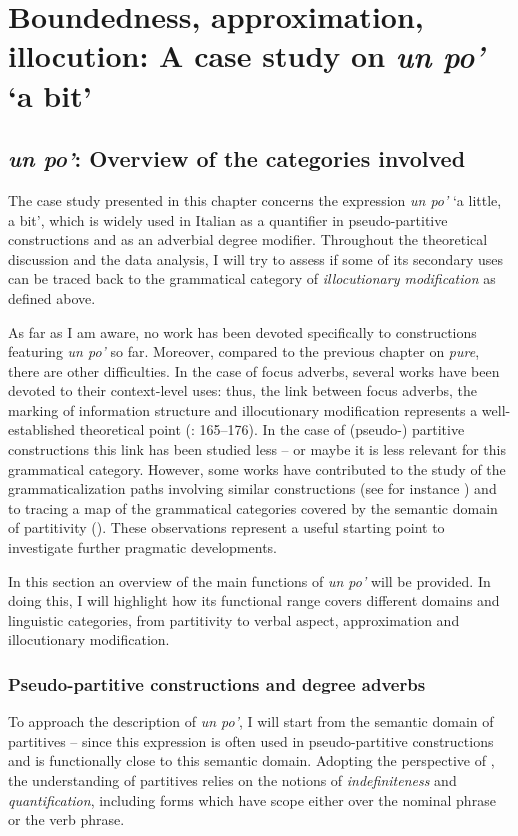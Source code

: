 \chapter{Boundedness, approximation, illocution: A case study on \textit{un po’} ‘a bit’}\label{sec:7}
\hypertarget{Toc124860657}{}\section{\textit{un po’}: Overview of the categories involved}
\hypertarget{Toc124860658}{}
The case study presented in this chapter concerns the expression \textit{un po’} ‘a little, a bit’, which is widely used in Italian as a quantifier in pseudo-partitive constructions and as an adverbial degree modifier. Throughout the theoretical discussion and the data analysis, I will try to assess if some of its secondary uses can be traced back to the grammatical category of \textit{illocutionary modification} as defined above.

As far as I am aware, no work has been devoted specifically to constructions featuring \textit{un po’} so far. Moreover, compared to the previous chapter on \textit{pure}, there are other difficulties. In the case of focus adverbs, several works have been devoted to their context-level uses: thus, the link between focus adverbs, the marking of information structure and illocutionary modification represents a well-established theoretical point (\citealt{König1991}: 165–176). In the case of (pseudo-) partitive constructions this link has been studied less – or maybe it is less relevant for this grammatical category. However, some works have contributed to the study of the grammaticalization paths involving similar constructions (see for instance \citealt{Traugott2008}) and to tracing a map of the grammatical categories covered by the semantic domain of partitivity (\citealt{LuraghiHuumo2014}). These observations represent a useful starting point to investigate further pragmatic developments.

In this section an overview of the main functions of \textit{un po’} will be provided. In doing this, I will highlight how its functional range covers different domains and linguistic categories, from partitivity to verbal aspect, approximation and illocutionary modification.

\subsection{Pseudo-partitive constructions and degree adverbs}
\hypertarget{Toc124860659}{}
To approach the description of \textit{un po’}, I will start from the semantic domain of partitives – since this expression is often used in pseudo-partitive constructions and is functionally close to this semantic domain. Adopting the perspective of \citet{LuraghiHuumo2014}, the understanding of partitives relies on the notions of \textit{indefiniteness} and \textit{quantification}, including forms which have scope either over the nominal phrase or the verb phrase.

